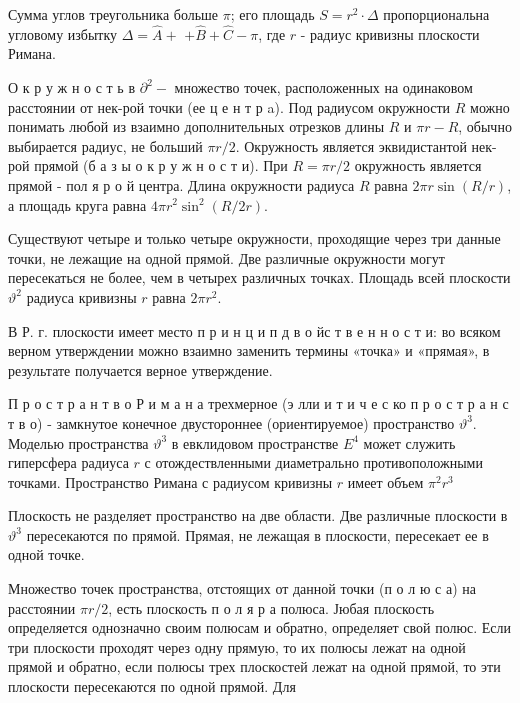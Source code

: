 \documentclass[10pt]{article}
\begin{document}
Сумма углов треугольника больше $\pi$; его площадь $S=r^{2} \cdot \Delta$ пропорциональна угловому избытку $\Delta=\widehat{A}+$ $+\hat{B}+\hat{C}-\pi$, где $r$ - радиус кривизны плоскости Римана.



О к р у ж н о с т ь в $\partial^{2}-$ множество точек, расположенных на одинаковом расстоянии от нек-рой точки (ее ц е н т р a). Под радиусом окружности $R$ можно понимать любой из взаимно дополнительных отрезков длины $R$ и $\pi r-R$, обычно выбирается радиус, не больший $\pi r / 2$. Окружность является эквидистантой нек-рой прямой (б а з ы о к р у ж н о с т и). При $R=\pi r / 2$ окружность является прямой - пол я р о й центра. Длина окружности радиуса $R$ равна $2 \pi r \sin (R / r)$, а площадь круга равна $4 \pi r^{2} \sin ^{2}(R / 2 r)$.



Существуют четыре и только четыре окружности, проходящие через три данные точки, не лежащие на одной прямой. Две различные окружности могут пересекаться не более, чем в четырех различных точках. Площадь всей плоскости $\vartheta^{2}$ радиуса кривизны $r$ равна $2 \pi r^{2}$.



В Р. г. плоскости имеет место п р и н ц и п д в о йс т в е н н о с т и: во всяком верном утверждении можно взаимно заменить термины «точка» и «прямая», в результате получается верное утверждение.



П р о с т р а н т в о Р и м а н а трехмерное (э лли и т и ч е с ко п р о с т р а н с т в о) - замкнутое конечное двустороннее (ориентируемое) пространство $\vartheta^{3}$. Моделью пространства $\vartheta^{3}$ в евклидовом пространстве $E^{4}$ может служить гиперсфера радиуса $r$ с отождествленными диаметрально противоположными точками. Пространство Римана с радиусом кривизны $r$ имеет объем $\pi^{2} r^{3}$



Плоскость не разделяет пространство на две области. Две различные плоскости в $\vartheta^{3}$ пересекаются по прямой. Прямая, не лежащая в плоскости, пересекает ее в одной точке.



Множество точек пространства, отстоящих от данной точки (п о л ю с а) на расстоянии $\pi r / 2$, есть плоскость п о л я р а полюса. Јюбая плоскость определяется однозначно своим полюсам и обратно, определяет свой полюс. Если три плоскости проходят через одну прямую, то их полюсы лежат на одной прямой и обратно, если полюсы трех плоскостей лежат на одной прямой, то эти плоскости пересекаются по одной прямой. Для
\end{document}
